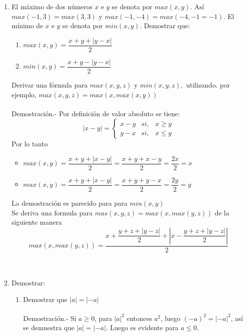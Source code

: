 \begin{enumerate}[\bfseries 1.]
\item El máximo de dos números $x$ e $y$ se denota por $max(x,y)$. Así $max(-1,3)=max(3,3)$ y $max(-1,-4)=max(-4,-1=-1)$. El mínimo de $x$ e $y$ se denota por $min(x,y)$. Demostrar que:
\begin{enumerate}[\bfseries 1.]
\item $max(x,y)=\dfrac{x+y+|y-x|}{2}$
\item $min(x,y)=\dfrac{x+y-|y-x|}{2}$
\end{enumerate}
Derivar una fórmula para $max(x,y,z)$ y $min(x,y,z),$ utilizando. por ejemplo, $max(x,y,z)=max(x,max(x,y))$ \\\\
Demostración.- \; Por definición de valor absoluto se tiene:
\begin{equation}
|x-y| = \left\lbrace
\begin{array}{crr}
x-y& si, & x\geq y\\
y-x& si, & x \leq y
\end{array}
\right.
\end{equation}
Por lo tanto 
\begin{itemize}
\item $max(x,y) = \dfrac{x+y+|x-y|}{2}= \dfrac{x+y+x-y}{2} =\dfrac{2x}{2}=x$\\
\item $max(x,y) = \dfrac{x+y+|x-y|}{2}= \dfrac{x+y+y-x}{2} =\dfrac{2y}{2}=y$
\end{itemize} 
La demostración es parecido para para $min(x,y)$\\
Se deriva una formula para $mas(x,y,z)=max(x,max(y,z))$ de la siguiente manera\\
$$max(x,max(y,z))=\dfrac{x+\dfrac{y+z+|y-z|}{2} + \left| x - \dfrac{y+z+|y-z|}{2} \right|}{2}$$\\\\ 

\item Demostrar:
\begin{enumerate}[\bfseries (a)]
\item Demostrar que $|a|=|-a|$\\\\
Demostración.- \; Si $a\geq 0$, para $|a|^2$ entonces $a^2$, luego $(-a)^2=|-a|^2$, así se demuestra que $|a|=|-a|$. Luego es evidente para $a \leq 0.$\\\\ 


\end{enumerate}
\end{enumerate}
